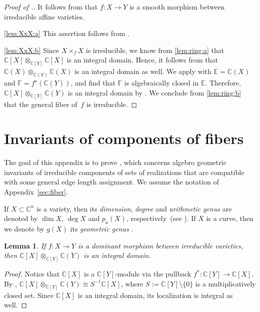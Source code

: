 \documentclass[12pt]{article}
\newtheorem{lemma}{Lemma}
\theoremstyle{definition}
\newcommand{\APP}[1]{Appendix~\ref{sec:#1}}
\newcommand{\RL}[2]{\Cref{lem:#1}\ref{lem:#1:#2}}
\newcommand{\df}[1]{{\it #1}}
\newcommand{\resp}{respectively}
\renewcommand{\c}{\colon}
\newcommand{\C}{{\mathbb{C}}}
\newcommand{\F}{{\mathbb{F}}}
\newcommand{\E}{{\mathbb{E}}}
\begin{document}
\begin{proof}[Proof of .]
It follows from \citep[Proposition~III.10.4]{1977}
that $f\c X\to Y$ is a smooth morphism between irreducible affine varieties.

\ref{lem:XxX:a} This assertion follows from \citep[Proposition~III.10.1(d)]{1977}.

\ref{lem:XxX:b} Since $X\times_f X$ is irreducible,
we know from \RL{ring}{a} that $\C[X]\otimes_{\C[Y]}\C[X]$ is an integral domain.
Hence, it follows from  that $\C(X)\otimes_{\C(Y)}\C(X)$ is an integral domain as well.
We apply  with $\E=\C(X)$ and $\F=f^\star(\C(Y))$,
and find that $\F$ is algebraically closed in $\E$.
Therefore, $\C[X]\otimes_{\C[Y]}\C(Y)$ is an integral domain by .
We conclude from \RL{ring}{b} that the general fiber of~$f$ is irreducible.
\end{proof}



\section{Invariants of components of fibers}
\label{sec:scheme}

The goal of this appendix is to prove , which concerns
algebro geometric invariants of irreducible components of sets
of realizations that are compatible with some general edge length assignment.
We assume the notation of \APP{fiber}.

If $X\subset \C^n$ is a variety, then its \df{dimension},
\df{degree} and \df{arithmetic genus} are denoted by $\dim X$, $\deg X$ and $p_a(X)$,
\resp~(see \citep[\textsection I.7 and Exercise~I.7.2]{1977}).
If $X$ is a curve, then we denote by $g(X)$ its \df{geometric genus} \citep[Remark~II.8.18.2]{1977}.

\begin{lemma}
\label{lem:gf}
If $f\c X\to Y$ is a dominant morphism between irreducible varieties,
then $\C[X]\otimes_{\C[Y]}\C(Y)$ is an integral domain.
\end{lemma}

\begin{proof}
Notice that $\C[X]$ is a $\C[Y]$-module
via the pullback $f^*\c\C[Y]\to\C[X]$.
By , $\C[X]\otimes_{\C[Y]}\C(Y)\cong S^{-1}\C[X]$,
where $S:=\C[Y]\setminus\{0\}$ is a multiplicatively closed set.
Since $\C[X]$ is an integral domain, its localization is integral as well.
\end{proof}
\end{document}
